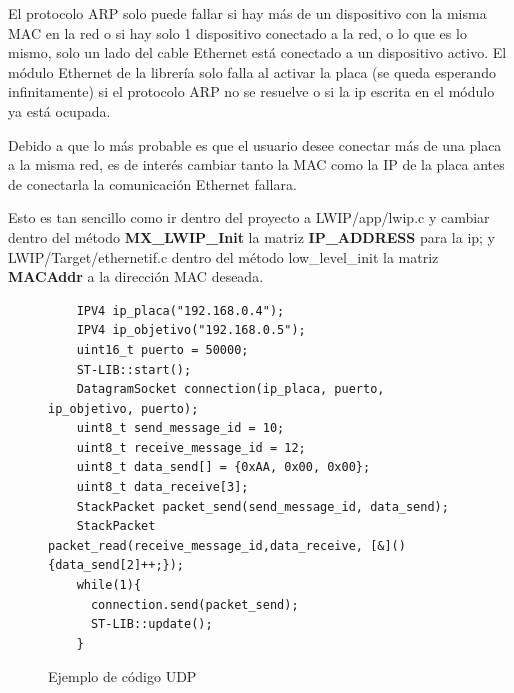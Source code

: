 \documentclass{report}
\begin{document}
\par \vspace{0.3cm}
El protocolo ARP solo puede fallar si hay más de un dispositivo con la misma MAC en la red o si hay solo 1 dispositivo conectado a la red, o lo que es lo mismo, solo un lado del cable Ethernet está conectado a un dispositivo activo. El módulo Ethernet de la librería solo falla al activar la placa (se queda esperando infinitamente) si el protocolo ARP no se resuelve o si la ip escrita en el módulo ya está ocupada. \par \vspace{0.3cm}
Debido a que lo más probable es que el usuario desee conectar más de una placa a la misma red, es de interés cambiar tanto la MAC como la IP de la placa antes de conectarla la comunicación Ethernet fallara. \par
Esto es tan sencillo como ir dentro del proyecto a LWIP/app/lwip.c y cambiar dentro del método \textbf{MX\_LWIP\_Init} la matriz \textbf{IP\_ADDRESS} para la ip; y LWIP/Target/ethernetif.c dentro del método low\_level\_init la matriz \textbf{MACAddr} a la dirección MAC deseada. 

\begin{figure}[h]
  \begin{lstlisting}
    IPV4 ip_placa("192.168.0.4");
    IPV4 ip_objetivo("192.168.0.5");
    uint16_t puerto = 50000;
    ST-LIB::start();
    DatagramSocket connection(ip_placa, puerto, ip_objetivo, puerto);
    uint8_t send_message_id = 10;
    uint8_t receive_message_id = 12;
    uint8_t data_send[] = {0xAA, 0x00, 0x00}; 
    uint8_t data_receive[3]; 
    StackPacket packet_send(send_message_id, data_send);
    StackPacket packet_read(receive_message_id,data_receive, [&](){data_send[2]++;});
    while(1){
      connection.send(packet_send);
      ST-LIB::update();
    }
  \end{lstlisting}
  \caption{Ejemplo de código UDP}
  \label{UDPcode}
\end{figure}
\par \vspace{0.3cm}
\end{document}
